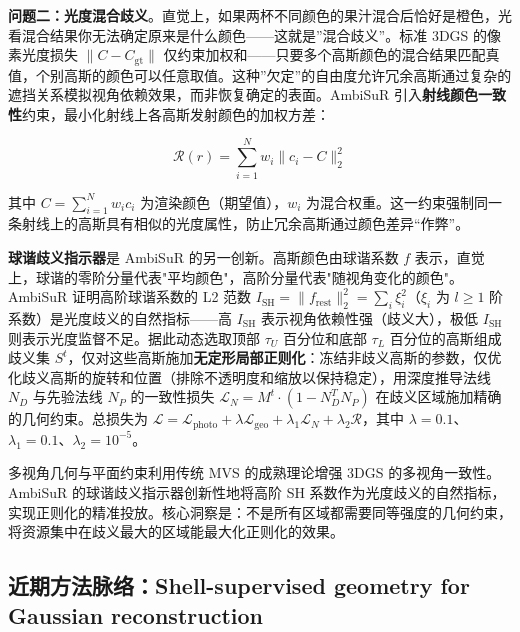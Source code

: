 \textbf{问题二：光度混合歧义}。直觉上，如果两杯不同颜色的果汁混合后恰好是橙色，光看混合结果你无法确定原来是什么颜色——这就是”混合歧义”。标准 3DGS 的像素光度损失 $\|C - C_{\text{gt}}\|$ 仅约束加权和——只要多个高斯颜色的混合结果匹配真值，个别高斯的颜色可以任意取值。这种”欠定”的自由度允许冗余高斯通过复杂的遮挡关系模拟视角依赖效果，而非恢复确定的表面。AmbiSuR 引入\textbf{射线颜色一致性}约束，最小化射线上各高斯发射颜色的加权方差：

\begin{equation}
\mathcal{R}(r) = \sum_{i=1}^N w_i \|c_i - C\|_2^2
\end{equation}

其中 $C = \sum_{i=1}^N w_i c_i$ 为渲染颜色（期望值），$w_i$ 为混合权重。这一约束强制同一条射线上的高斯具有相似的光度属性，防止冗余高斯通过颜色差异“作弊”。

\textbf{球谐歧义指示器}是 AmbiSuR 的另一创新。高斯颜色由球谐系数 $f$ 表示，直觉上，球谐的零阶分量代表"平均颜色"，高阶分量代表"随视角变化的颜色"。AmbiSuR 证明高阶球谐系数的 L2 范数 $I_{\text{SH}} = \|f_{\text{rest}}\|_2^2 = \sum_i \xi_i^2$（$\xi_i$ 为 $l \geq 1$ 阶系数）是光度歧义的自然指标——高 $I_{\text{SH}}$ 表示视角依赖性强（歧义大），极低 $I_{\text{SH}}$ 则表示光度监督不足。据此动态选取顶部 $\tau_U$ 百分位和底部 $\tau_L$ 百分位的高斯组成歧义集 $S^t$，仅对这些高斯施加\textbf{无定形局部正则化}：冻结非歧义高斯的参数，仅优化歧义高斯的旋转和位置（排除不透明度和缩放以保持稳定），用深度推导法线 $N_D$ 与先验法线 $N_P$ 的一致性损失 $\mathcal{L}_N = M^t \cdot (1 - N_D^T N_P)$ 在歧义区域施加精确的几何约束。总损失为 $\mathcal{L} = \mathcal{L}_{\text{photo}} + \lambda \mathcal{L}_{\text{geo}} + \lambda_1 \mathcal{L}_N + \lambda_2 \mathcal{R}$，其中 $\lambda = 0.1$、$\lambda_1 = 0.1$、$\lambda_2 = 10^{-5}$。

\begin{takeaway}
多视角几何与平面约束利用传统 MVS 的成熟理论增强 3DGS 的多视角一致性。AmbiSuR 的球谐歧义指示器创新性地将高阶 SH 系数作为光度歧义的自然指标，实现正则化的精准投放。核心洞察是：不是所有区域都需要同等强度的几何约束，将资源集中在歧义最大的区域能最大化正则化的效果。
\end{takeaway}


\subsection{近期方法脉络：Shell-supervised geometry for Gaussian reconstruction}

